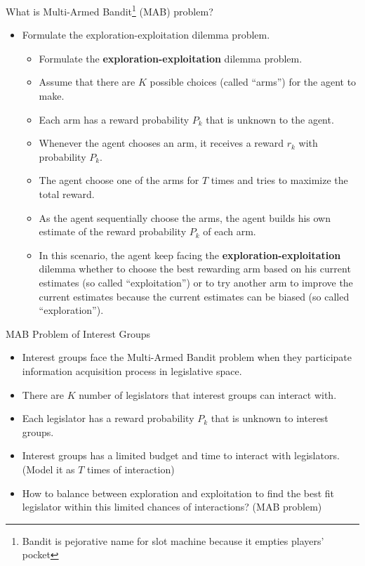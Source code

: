 \documentclass{beamer}
\begin{document}
	\begin{frame}{What is Multi-Armed Bandit\footnote{Bandit is pejorative name for slot machine because it empties players' pocket} (MAB) problem?}
		\begin{itemize}
			\item Formulate the exploration-exploitation dilemma problem.
			\begin{itemize}
				\item Formulate the \textbf{exploration-exploitation} dilemma problem.
				\item Assume that there are $K$ possible choices (called ``arms'') for the agent to make. 
				\item Each arm has a reward probability $P_k$ that is unknown to the agent.
				\item Whenever the agent chooses an arm, it receives a reward $r_k$ with probability $P_k$.
				\item The agent choose one of the arms for $T$ times and tries to maximize the total reward.
				\item As the agent sequentially choose the arms, the agent builds his own estimate of the reward probability $P_k$ of each arm.
				\item In this scenario, the agent keep facing the \textbf{exploration-exploitation} dilemma whether to choose the best rewarding arm based on his current estimates (so called ``exploitation'') or to try another arm to improve the current estimates because the current estimates can be biased (so called ``exploration'').
			\end{itemize}
		\end{itemize}
	\end{frame}

	\begin{frame}{MAB Problem of Interest Groups}
		\begin{itemize}
			\item Interest groups face the Multi-Armed Bandit problem when they participate information acquisition process in legislative space.
			\item There are $K$ number of legislators that interest groups can interact with. 
			\item Each legislator has a reward probability $P_k$ that is unknown to interest groups.
			\item Interest groups has a limited budget and time to interact with legislators. (Model it as $T$ times of interaction)
			\item How to balance between exploration and exploitation to find the best fit legislator within this limited chances of interactions? (MAB problem)
		\end{itemize}
	\end{frame}
\end{document}
